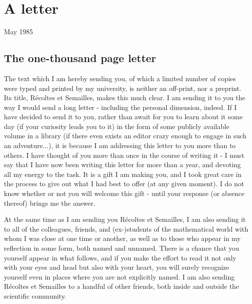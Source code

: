 \begin{comment}
\documentclass{book}
\usepackage{master}
\newcommand{\rec}{$\text{R\'ecoltes et Semailles}$}
\newcommand{\no}{n$^\circ$}
\hfuzz = 100pt

\end{comment}

\chapter{A letter}
\label{chapter:3}

May 1985

\section{The one-thousand page letter}

The text which I am hereby sending you, of which a limited number of copies were typed and printed by my university, is neither an off-print, nor a preprint. Its title, R\'ecoltes et Semailles, makes this much clear. I am sending it to you the way I would send a long letter - including the personal dimension, indeed. If I have decided to send it to you, rather than await for you to learn about it some day (if your curiosity leads you to it) in the form of some publicly available volume in a library (if there even exists an editor crazy enough to engage in such an adventure...), it is because I am addressing this letter to you more than to others. I have thought of you more than once in the course of writing it - I must say that I have now been writing this letter for more than a year, and devoting all my energy to the task. It is a gift I am making you, and I took great care in the process to give out what I had best to offer (at any given moment). I do not know whether or not you will welcome this gift - until your response (or absence thereof) brings me the answer. 

At the same time as I am sending you R\'ecoltes et Semailles, I am also sending it to all of the colleagues, friends, and (ex-)students of the mathematical world with whom I was close at one time or another, as well as to those who appear in my reflection in some form, both named and unnamed. There is a chance that you yourself appear in what follows, and if you make the effort to read it not only with your eyes and head but also with your heart, you will surely recognize yourself even in places where you are not explicitly named. I am also sending R\'ecoltes et Semailles to a handful of other friends, both inside and outside the scientific community.

